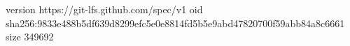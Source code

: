 version https://git-lfs.github.com/spec/v1
oid sha256:9833e488b5df639d8299efc5e0e8814fd5b5e9abd47820700f59abb84a8c6661
size 349692
